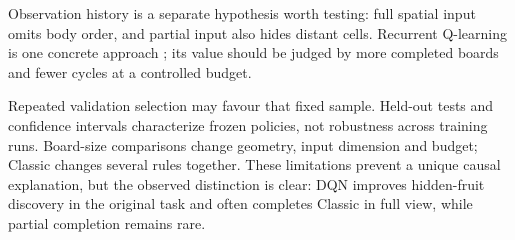 \documentclass{article}
\begin{document}
Observation history is a separate hypothesis worth testing: full spatial input omits body order, and partial input also hides distant cells. Recurrent Q-learning is one concrete approach \citep[``DRQN Architecture'']{hausknecht2015drqn}; its value should be judged by more completed boards and fewer cycles at a controlled budget.

Repeated validation selection may favour that fixed sample. Held-out tests and confidence intervals characterize frozen policies, not robustness across training runs. Board-size comparisons change geometry, input dimension and budget; Classic changes several rules together. These limitations prevent a unique causal explanation, but the observed distinction is clear: DQN improves hidden-fruit discovery in the original task and often completes Classic in full view, while partial completion remains rare.

\clearpage


\end{document}
